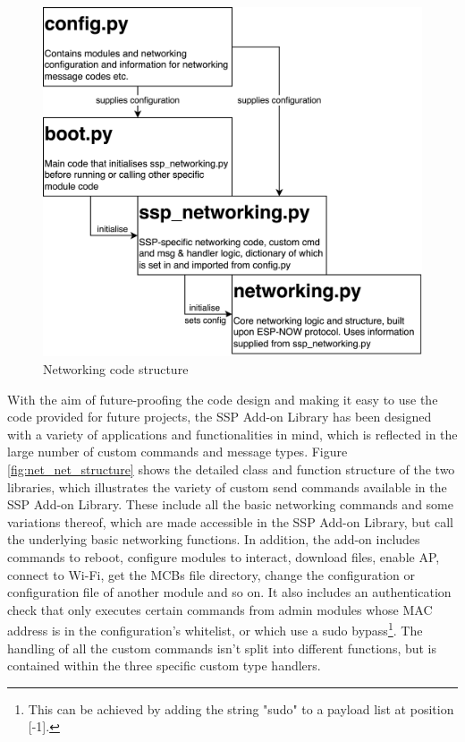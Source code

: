 \begin{figure}[H]
    \centering
    \includegraphics[width=.6\linewidth]{overleaf/images/code_structure.png}
    \vspace{\ftspace}
    \caption{Networking code structure}
    \label{fig:net_code_structure}
\end{figure}

With the aim of future-proofing the code design and making it easy to use the code provided for future projects, the SSP Add-on Library has been designed with a variety of applications and functionalities in mind, which is reflected in the large number of custom commands and message types. Figure \ref{fig:net_net_structure} shows the detailed class and function structure of the two libraries, which illustrates the variety of custom send commands available in the SSP Add-on Library. These include all the basic networking commands and some variations thereof, which are made accessible in the SSP Add-on Library, but call the underlying basic networking functions. In addition, the add-on includes commands to reboot, configure modules to interact, download files, enable AP, connect to Wi-Fi, get the MCBs file directory, change the configuration or configuration file of another module and so on. It also includes an authentication check that only executes certain commands from admin modules whose MAC address is in the configuration's whitelist, or which use a sudo bypass\footnote{This can be achieved by adding the string "sudo" to a payload list at position [-1].}. The handling of all the custom commands isn't split into different functions, but is contained within the three specific custom type handlers.

